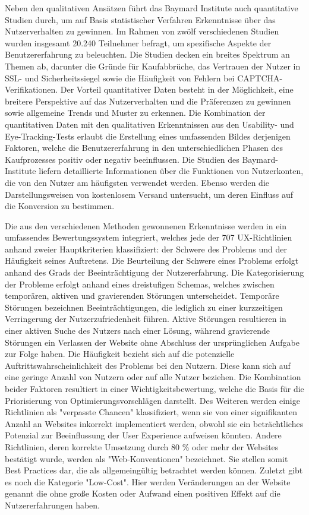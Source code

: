 Neben den qualitativen Ansätzen führt das Baymard Institute auch quantitative Studien durch, um auf Basis statistischer Verfahren Erkenntnisse über das Nutzerverhalten zu gewinnen. Im Rahmen von zwölf verschiedenen Studien wurden insgesamt 20.240 Teilnehmer befragt, um spezifische Aspekte der Benutzererfahrung zu beleuchten. Die Studien decken ein breites Spektrum an Themen ab, darunter die Gründe für Kaufabbrüche, das Vertrauen der Nutzer in SSL- und Sicherheitssiegel sowie die Häufigkeit von Fehlern bei CAPTCHA-Verifikationen. Der Vorteil quantitativer Daten besteht in der Möglichkeit, eine breitere Perspektive auf das Nutzerverhalten und die Präferenzen zu gewinnen sowie allgemeine Trends und Muster zu erkennen. Die Kombination der quantitativen Daten mit den qualitativen Erkenntnissen aus den Usability- und Eye-Tracking-Tests erlaubt die Erstellung eines umfassenden Bildes derjenigen Faktoren, welche die Benutzererfahrung in den unterschiedlichen Phasen des Kaufprozesses positiv oder negativ beeinflussen. Die Studien des Baymard-Institute liefern detaillierte Informationen über die Funktionen von Nutzerkonten, die von den Nutzer am häufigsten verwendet werden. Ebenso werden die Darstellungsweisen von kostenlosem Versand untersucht, um deren Einfluss auf die Konversion zu bestimmen.

Die aus den verschiedenen Methoden gewonnenen Erkenntnisse werden in ein umfassendes Bewertungssystem integriert, welches jede der 707 UX-Richtlinien anhand zweier Hauptkriterien klassifiziert: der Schwere des Problems und der Häufigkeit seines Auftretens. Die Beurteilung der Schwere eines Problems erfolgt anhand des Grads der Beeinträchtigung der Nutzererfahrung. Die Kategorisierung der Probleme erfolgt anhand eines dreistufigen Schemas, welches zwischen temporären, aktiven und gravierenden Störungen unterscheidet. Temporäre Störungen bezeichnen Beeinträchtigungen, die lediglich zu einer kurzzeitigen Verringerung der Nutzerzufriedenheit führen. Aktive Störungen resultieren in einer aktiven Suche des Nutzers nach einer Lösung, während gravierende Störungen ein Verlassen der Website ohne Abschluss der ursprünglichen Aufgabe zur Folge haben. Die Häufigkeit bezieht sich auf die potenzielle Auftrittswahrscheinlichkeit des Problems bei den Nutzern. Diese kann sich auf eine geringe Anzahl von Nutzern oder auf alle Nutzer beziehen. Die Kombination beider Faktoren resultiert in einer Wichtigkeitsbewertung, welche die Basis für die Priorisierung von Optimierungsvorschlägen darstellt. Des Weiteren werden einige Richtlinien als "verpasste Chancen" klassifiziert, wenn sie von einer signifikanten Anzahl an Websites inkorrekt implementiert werden, obwohl sie ein beträchtliches Potenzial zur Beeinflussung der User Experience aufweisen könnten. Andere Richtlinien, deren korrekte Umsetzung durch 80 \% oder mehr der Websites bestätigt wurde, werden als "Web-Konventionen" bezeichnet. Sie stellen somit Best Practices dar, die als allgemeingültig betrachtet werden können. Zuletzt gibt es noch die Kategorie "Low-Cost". Hier werden Veränderungen an der Website genannt die ohne große Kosten oder Aufwand einen positiven Effekt auf die Nutzererfahrungen haben. 

